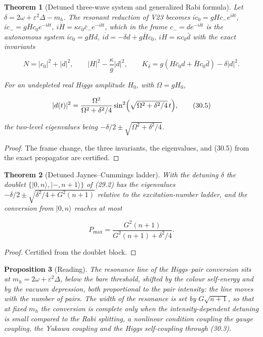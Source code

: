 \documentclass[11pt]{article}
\newtheorem{theorem}{Theorem}[section]
\newtheorem{proposition}[theorem]{Proposition}
\theoremstyle{remark}
\begin{document}
\begin{theorem}[Detuned three-wave system and generalized Rabi formula]
\label{thm:v20v27-classical}
Let \(\delta=2\omega+\varepsilon^2\Delta-m_h\).  The resonant reduction of
V23 becomes \(i\dot c_0=gHc_-e^{i\delta t}\),
\(i\dot c_-=g\bar Hc_0e^{-i\delta t}\), \(i\dot H=\kappa c_0\bar c_-e^{-i\delta t}\),
which in the frame \(c_-=de^{-i\delta t}\) is the autonomous system
\(i\dot c_0=gHd\), \(i\dot d=-\delta d+g\bar Hc_0\), \(i\dot H=\kappa c_0\bar d\)
with the exact invariants

\[
 N=|c_0|^2+|d|^2,\qquad |H|^2-\frac\kappa g|d|^2,\qquad
 K_\delta=g(H\bar c_0d+\bar Hc_0\bar d)-\delta|d|^2.                    \tag{30.4}
\]

For an undepleted real Higgs amplitude \(H_0\), with \(\Omega=gH_0\),

\[
 |d(t)|^2=\frac{\Omega^2}{\Omega^2+\delta^2/4}\sin^2\Bigl(\sqrt{\Omega^2+\delta^2/4}\,t\Bigr),
                                                                    \tag{30.5}
\]

the two-level eigenvalues being \(-\delta/2\pm\sqrt{\Omega^2+\delta^2/4}\).
\end{theorem}

\begin{proof}
The frame change, the three invariants, the eigenvalues, and (30.5)
from the exact propagator are certified.
\end{proof}

\begin{theorem}[Detuned Jaynes--Cummings ladder]
\label{thm:v20v27-jc}
With the detuning \(\delta\) the doublet \(\{|0,n\rangle,|-,n+1\rangle\}\)
of (29.2) has the eigenvalues \(-\delta/2\pm\sqrt{\delta^2/4+G^2(n+1)}\)
relative to the excitation-number ladder, and the conversion from
\(|0,n\rangle\) reaches at most

\[
 P_{\max}=\frac{G^2(n+1)}{G^2(n+1)+\delta^2/4}.                       \tag{30.6}
\]
\end{theorem}

\begin{proof}
Certified from the doublet block.
\end{proof}

\begin{proposition}[Reading]
\label{prop:v20v27-reading}
The resonance line of the Higgs--pair conversion sits at
\(m_h=2\omega+\varepsilon^2\Delta\), below the bare threshold, shifted by
the colour self-energy and by the vacuum depression, both
proportional to the pair intensity: the line moves with the number
of pairs.  The width of the resonance is set by \(G\sqrt{n+1}\), so
that at fixed \(m_h\) the conversion is complete only when the
intensity-dependent detuning is small compared to the Rabi
splitting, a nonlinear condition coupling the gauge coupling, the
Yukawa coupling and the Higgs self-coupling through (30.3).
\end{proposition}
\end{document}
